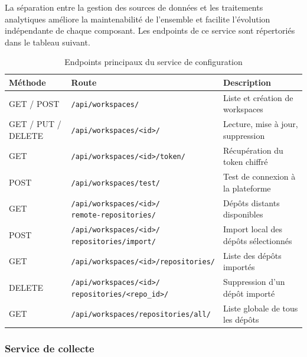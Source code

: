 La séparation entre la gestion des sources de données et les traitements analytiques améliore la
maintenabilité de l'ensemble et facilite l'évolution indépendante de chaque composant. Les
endpoints de ce service sont répertoriés dans le tableau suivant.

\begin{table}[H]
\centering
\small
\caption{Endpoints principaux du service de configuration}
\label{tab:endpoints-config}
\begin{tabular}{|>{\centering\arraybackslash}p{2cm}
                |>{\raggedright\arraybackslash}p{7cm}
                |>{\raggedright\arraybackslash}p{3.5cm}|}
\hline
\textbf{Méthode} & \textbf{Route} & \textbf{Description} \\
\hline
GET / POST & \texttt{/api/workspaces/} & Liste et création de workspaces \\
\hline
GET / PUT / DELETE & \texttt{/api/workspaces/<id>/} & Lecture, mise à jour, suppression \\
\hline
GET & \texttt{/api/workspaces/<id>/token/} & Récupération du token chiffré \\
\hline
POST & \texttt{/api/workspaces/test/} & Test de connexion à la plateforme \\
\hline
GET & \makecell[l]{\texttt{/api/workspaces/<id>/} \\ \texttt{remote-repositories/}} & Dépôts distants disponibles \\
\hline
POST & \makecell[l]{\texttt{/api/workspaces/<id>/} \\ \texttt{repositories/import/}} & Import local des dépôts sélectionnés \\
\hline
GET & \texttt{/api/workspaces/<id>/repositories/} & Liste des dépôts importés \\
\hline
DELETE & \makecell[l]{\texttt{/api/workspaces/<id>/} \\ \texttt{repositories/<repo\_id>/}} & Suppression d'un dépôt importé \\
\hline
GET & \texttt{/api/workspaces/repositories/all/} & Liste globale de tous les dépôts \\
\hline
\end{tabular}
\end{table}

\subsubsection{Service de collecte}

